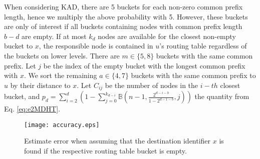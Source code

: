 \documentclass[10pt, conference, compsocconf, letterpaper]{IEEEtran}
\renewcommand{\binom}{\mathbb{B}}
\begin{document}
When considering KAD, there are 5 buckets for each non-zero common prefix length, hence we multiply the above probability
with 5. 
However, these buckets are only of interest if all buckets containing nodes with common prefix length $b-d$
are empty. 
If at most $k_d$ nodes are available for the closest non-empty bucket to $x$, the responsible node is
contained in $u$'s routing table regardless of the buckets on lower levels.
There are $m \in \{5,8\}$ buckets with the same common prefix. 
Let $j$ be the index of the empty bucket with the longest common prefix with $x$.
We sort the remaining $a \in \{4,7\}$ buckets with the same common prefix to $u$ by their distance to $x$. Let $C_{ij}$ be the number of nodes in the $i-th$
closest bucket, and $p_d= \sum_{i=2}^d \left(1 - \sum_{j=0}^{k_{d-i}}\binom(n-1,\frac{2^{d-i-b}}{1-2^{d-1-b}},j)\right)$
the quantity from Eq. \ref{eq:e2MDHT}. 

\begin{figure}
\captionsetup{font=scriptsize}
\texttt{[image: accuracy.eps]}
\caption{Estimate error when assuming that the destination identifier $x$ is found if the respective routing table bucket is empty.}
\label{fig:error}
\end{figure}
\end{document}
